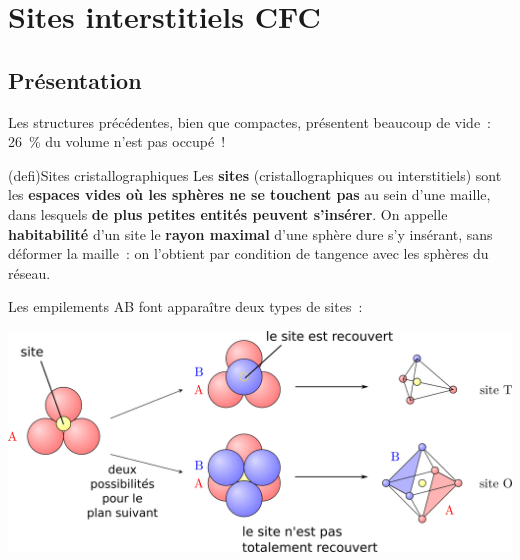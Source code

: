 \documentclass[../../main/main.tex]{subfiles}
\begin{document}
\section{Sites interstitiels CFC}
\subsection{Présentation}
Les structures précédentes, bien que compactes, présentent beaucoup de vide~:
\SI{26}{\%} du volume n'est pas occupé~!
\begin{tcb*}(defi){Sites cristallographiques}
  Les \textbf{sites} (cristallographiques ou interstitiels) sont les
  \textbf{espaces vides où les sphères ne se touchent pas} au sein d'une maille,
  dans lesquels \textbf{de plus petites entités peuvent s'insérer}.
	\smallbreak
	On appelle \textbf{habitabilité} d'un site le \textbf{rayon maximal} d'une
	sphère dure s'y insérant, sans déformer la maille~: on l'obtient par condition
	de tangence avec les sphères du réseau.
\end{tcb*}

Les empilements AB font apparaître deux types de sites~:
\begin{center}
	\includegraphics[scale=1]{sites_pres}
\end{center}
\end{document}
